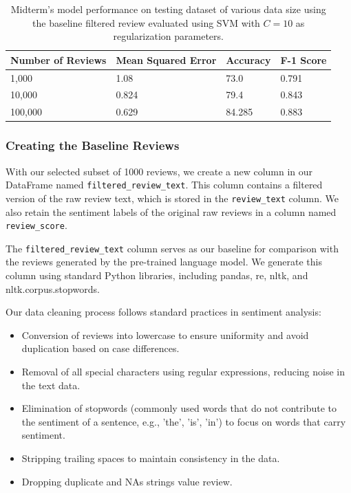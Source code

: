 \documentclass{article}
\begin{document}
\begin{table}[h]
\centering
\begin{tabular}{llll}
\toprule
\textbf{Number of Reviews} & \textbf{Mean Squared Error} & \textbf{Accuracy} & \textbf{F-1 Score} \\
\midrule
1,000 & 1.08 & 73.0 & 0.791 \\
10,000 & 0.824 & 79.4 & 0.843 \\
100,000 & 0.629 & 84.285 & 0.883 \\
\bottomrule
\end{tabular}
\caption{Midterm's model performance on testing dataset of various data size using the baseline filtered review evaluated using SVM with $C=10$ as regularization parameters.}
\end{table}

\subsubsection{Creating the Baseline Reviews}

With our selected subset of 1000 reviews, we create a new column in our DataFrame named \texttt{filtered\_review\_text}. This column contains a filtered version of the raw review text, which is stored in the \texttt{review\_text} column. We also retain the sentiment labels of the original raw reviews in a column named \texttt{review\_score}.

The \texttt{filtered\_review\_text} column serves as our baseline for comparison with the reviews generated by the pre-trained language model. We generate this column using standard Python libraries, including pandas, re, nltk, and nltk.corpus.stopwords.

Our data cleaning process follows standard practices in sentiment analysis:

\begin{itemize}
    \item Conversion of reviews into lowercase to ensure uniformity and avoid duplication based on case differences.
    \item Removal of all special characters using regular expressions, reducing noise in the text data.
    \item Elimination of stopwords (commonly used words that do not contribute to the sentiment of a sentence, e.g., 'the', 'is', 'in') to focus on words that carry sentiment.
    \item Stripping trailing spaces to maintain consistency in the data.
    \item Dropping duplicate and NAs strings value review.
\end{itemize}
\end{document}

